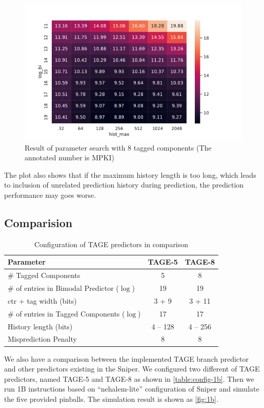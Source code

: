 \documentclass[screen,nonacm]{acmart}
\begin{document}
\begin{figure}
  \centering
  \includegraphics[width=0.64\linewidth]{images/tage8.pdf}
  \caption{Result of parameter search with 8 tagged components (The annotated number is MPKI)}\label{fig:tage8}
\end{figure}


The plot also shows that if the maximum history length is too long,
which leads to inclusion of unrelated prediction history during prediction,
the prediction performance may goes worse.


\subsection{Comparision}


\begin{table}
  \caption{Configuration of TAGE predictors in comparison}
  \label{table:config-1b}
  \centering
  \begin{tabular}{l|cc}
    \toprule
    Parameter                                     & TAGE-5   & TAGE-8   \\
    \midrule
    \# Tagged Components                          & 5        & 8        \\
    \# of entries in Bimodal Predictor (\(\log\)) & 19       & 19       \\
    \textsf{ctr} + \textsf{tag} width (bits)      & 3 + 9    & 3 + 11   \\
    \# of entries in Tagged Components (\(\log\)) & 17       & 17       \\
    History length (bits)                         & 4 -- 128 & 4 -- 256 \\
    Misprediction Penalty                         & 8        & 8        \\
    \bottomrule
  \end{tabular}
\end{table}


We also have a comparison between the implemented TAGE branch predictor and other predictors existing in the Sniper.
We configured two different of TAGE predictors, named TAGE-5 and TAGE-8 as shown in \autoref{table:config-1b}.
Then we run 1B instructions based on ``nehalem-lite'' configuration of Sniper and simulate the five provided pinballs.
The simulation result is shown as \autoref{fig:1b}.
\end{document}
